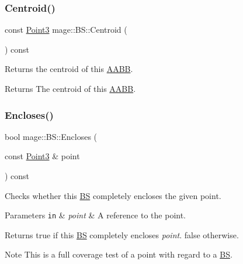 \subsubsection{\texorpdfstring{Centroid()}{Centroid()}}
{\footnotesize\ttfamily const \hyperlink{structmage_1_1_point3}{Point3} mage\+::\+B\+S\+::\+Centroid (\begin{DoxyParamCaption}{ }\end{DoxyParamCaption}) const\hspace{0.3cm}{\ttfamily [noexcept]}}

Returns the centroid of this \hyperlink{structmage_1_1_a_a_b_b}{A\+A\+BB}.

\begin{DoxyReturn}{Returns}
The centroid of this \hyperlink{structmage_1_1_a_a_b_b}{A\+A\+BB}. 
\end{DoxyReturn}
\hypertarget{structmage_1_1_b_s_a0050f2e110b107ae98bb9f33e3386758}{}\label{structmage_1_1_b_s_a0050f2e110b107ae98bb9f33e3386758} 
\subsubsection{\texorpdfstring{Encloses()}{Encloses()}\hspace{0.1cm}{\footnotesize\ttfamily [1/4]}}
{\footnotesize\ttfamily bool mage\+::\+B\+S\+::\+Encloses (\begin{DoxyParamCaption}\item[{const \hyperlink{structmage_1_1_point3}{Point3} \&}]{point }\end{DoxyParamCaption}) const\hspace{0.3cm}{\ttfamily [noexcept]}}

Checks whether this \hyperlink{structmage_1_1_b_s}{BS} completely encloses the given point.


\begin{DoxyParams}[1]{Parameters}
\mbox{\tt in}  & {\em point} & A reference to the point. \\
\hline
\end{DoxyParams}
\begin{DoxyReturn}{Returns}
{\ttfamily true} if this \hyperlink{structmage_1_1_b_s}{BS} completely encloses {\itshape point}. {\ttfamily false} otherwise. 
\end{DoxyReturn}
\begin{DoxyNote}{Note}
This is a full coverage test of a point with regard to a \hyperlink{structmage_1_1_b_s}{BS}. 
\end{DoxyNote}
\hypertarget{structmage_1_1_b_s_a4f312c5d09aaa97dd85702713ad26d07}{}\label{structmage_1_1_b_s_a4f312c5d09aaa97dd85702713ad26d07} 
